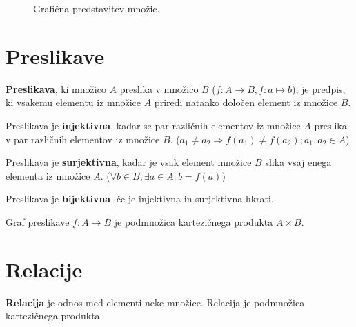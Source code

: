 \documentclass[a4paper,oneside,12pt,fleqn]{article}
\newcommand{\beforecaptionskip}{\vspace{-12pt}}
\renewcommand\implies\Rightarrow
\numberwithin{equation}{section}
\begin{document}
\begin{figure}[h]
  \begin{center}
    \hspace{2em}
  \end{center}
  \beforecaptionskip
  \caption{Grafična predstavitev množic.}
  \label{fig:mnoz}
\end{figure}

\section{Preslikave}
\label{sec:preslikave}
\textbf{Preslikava}, ki množico $A$ preslika v množico $B$ ($f\!\!: A \rightarrow B,
f\!\!:a \mapsto b$), je predpis, ki vsakemu elementu iz
množice $A$ priredi natanko določen element iz množice $B$. 

Preslikava je \textbf{injektivna}, kadar se par različnih elementov iz množice $A$ preslika v par
različnih elementov iz množice $B$. ($a_1 \neq a_2 \implies f(a_1) \neq f(a_2); a_1, a_2
\in A$)

Preslikava je \textbf{surjektivna}, kadar je vsak element množice $B$ slika vsaj enega elementa iz
množice $A$. ($\forall b \in B, \exists a \in A\!: b = f(a)$)

Preslikava je \textbf{bijektivna}, če je injektivna in surjektivna hkrati.

Graf preslikave $f\!\!: A \rightarrow B$ je podmnožica kartezičnega produkta $A \times B$.

\section{Relacije}
\label{sec:relacije}
\textbf{Relacija} je odnos med elementi neke množice.
Relacija je podmnožica kartezičnega produkta.
\end{document}
